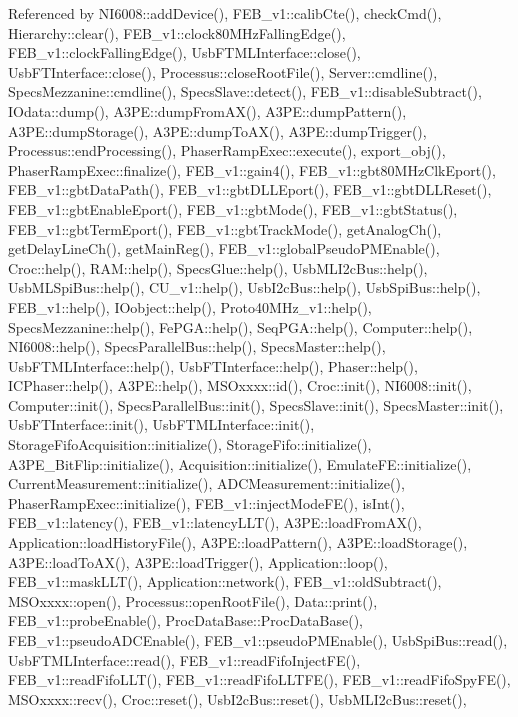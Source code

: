 Referenced by N\+I6008\+::add\+Device(), F\+E\+B\+\_\+v1\+::calib\+Cte(), check\+Cmd(), Hierarchy\+::clear(), F\+E\+B\+\_\+v1\+::clock80\+M\+Hz\+Falling\+Edge(), F\+E\+B\+\_\+v1\+::clock\+Falling\+Edge(), Usb\+F\+T\+M\+L\+Interface\+::close(), Usb\+F\+T\+Interface\+::close(), Processus\+::close\+Root\+File(), Server\+::cmdline(), Specs\+Mezzanine\+::cmdline(), Specs\+Slave\+::detect(), F\+E\+B\+\_\+v1\+::disable\+Subtract(), I\+Odata\+::dump(), A3\+P\+E\+::dump\+From\+A\+X(), A3\+P\+E\+::dump\+Pattern(), A3\+P\+E\+::dump\+Storage(), A3\+P\+E\+::dump\+To\+A\+X(), A3\+P\+E\+::dump\+Trigger(), Processus\+::end\+Processing(), Phaser\+Ramp\+Exec\+::execute(), export\+\_\+obj(), Phaser\+Ramp\+Exec\+::finalize(), F\+E\+B\+\_\+v1\+::gain4(), F\+E\+B\+\_\+v1\+::gbt80\+M\+Hz\+Clk\+Eport(), F\+E\+B\+\_\+v1\+::gbt\+Data\+Path(), F\+E\+B\+\_\+v1\+::gbt\+D\+L\+L\+Eport(), F\+E\+B\+\_\+v1\+::gbt\+D\+L\+L\+Reset(), F\+E\+B\+\_\+v1\+::gbt\+Enable\+Eport(), F\+E\+B\+\_\+v1\+::gbt\+Mode(), F\+E\+B\+\_\+v1\+::gbt\+Status(), F\+E\+B\+\_\+v1\+::gbt\+Term\+Eport(), F\+E\+B\+\_\+v1\+::gbt\+Track\+Mode(), get\+Analog\+Ch(), get\+Delay\+Line\+Ch(), get\+Main\+Reg(), F\+E\+B\+\_\+v1\+::global\+Pseudo\+P\+M\+Enable(), Croc\+::help(), R\+A\+M\+::help(), Specs\+Glue\+::help(), Usb\+M\+L\+I2c\+Bus\+::help(), Usb\+M\+L\+Spi\+Bus\+::help(), C\+U\+\_\+v1\+::help(), Usb\+I2c\+Bus\+::help(), Usb\+Spi\+Bus\+::help(), F\+E\+B\+\_\+v1\+::help(), I\+Oobject\+::help(), Proto40\+M\+Hz\+\_\+v1\+::help(), Specs\+Mezzanine\+::help(), Fe\+P\+G\+A\+::help(), Seq\+P\+G\+A\+::help(), Computer\+::help(), N\+I6008\+::help(), Specs\+Parallel\+Bus\+::help(), Specs\+Master\+::help(), Usb\+F\+T\+M\+L\+Interface\+::help(), Usb\+F\+T\+Interface\+::help(), Phaser\+::help(), I\+C\+Phaser\+::help(), A3\+P\+E\+::help(), M\+S\+Oxxxx\+::id(), Croc\+::init(), N\+I6008\+::init(), Computer\+::init(), Specs\+Parallel\+Bus\+::init(), Specs\+Slave\+::init(), Specs\+Master\+::init(), Usb\+F\+T\+Interface\+::init(), Usb\+F\+T\+M\+L\+Interface\+::init(), Storage\+Fifo\+Acquisition\+::initialize(), Storage\+Fifo\+::initialize(), A3\+P\+E\+\_\+\+Bit\+Flip\+::initialize(), Acquisition\+::initialize(), Emulate\+F\+E\+::initialize(), Current\+Measurement\+::initialize(), A\+D\+C\+Measurement\+::initialize(), Phaser\+Ramp\+Exec\+::initialize(), F\+E\+B\+\_\+v1\+::inject\+Mode\+F\+E(), is\+Int(), F\+E\+B\+\_\+v1\+::latency(), F\+E\+B\+\_\+v1\+::latency\+L\+L\+T(), A3\+P\+E\+::load\+From\+A\+X(), Application\+::load\+History\+File(), A3\+P\+E\+::load\+Pattern(), A3\+P\+E\+::load\+Storage(), A3\+P\+E\+::load\+To\+A\+X(), A3\+P\+E\+::load\+Trigger(), Application\+::loop(), F\+E\+B\+\_\+v1\+::mask\+L\+L\+T(), Application\+::network(), F\+E\+B\+\_\+v1\+::old\+Subtract(), M\+S\+Oxxxx\+::open(), Processus\+::open\+Root\+File(), Data\+::print(), F\+E\+B\+\_\+v1\+::probe\+Enable(), Proc\+Data\+Base\+::\+Proc\+Data\+Base(), F\+E\+B\+\_\+v1\+::pseudo\+A\+D\+C\+Enable(), F\+E\+B\+\_\+v1\+::pseudo\+P\+M\+Enable(), Usb\+Spi\+Bus\+::read(), Usb\+F\+T\+M\+L\+Interface\+::read(), F\+E\+B\+\_\+v1\+::read\+Fifo\+Inject\+F\+E(), F\+E\+B\+\_\+v1\+::read\+Fifo\+L\+L\+T(), F\+E\+B\+\_\+v1\+::read\+Fifo\+L\+L\+T\+F\+E(), F\+E\+B\+\_\+v1\+::read\+Fifo\+Spy\+F\+E(), M\+S\+Oxxxx\+::recv(), Croc\+::reset(), Usb\+I2c\+Bus\+::reset(), Usb\+M\+L\+I2c\+Bus\+::reset(), 
